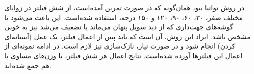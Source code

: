\documentclass[12pt,a4paper]{article}
\theoremstyle{definition}
\theoremstyle{theorem}
\theoremstyle{definition}
\begin{document}
\vspace{0.2cm}
\begin{center}
\vspace{0.5cm}
\end{center}

در روش نواتیا ببو، همان‌گونه که در صورت تمرین آمده‌است، از شش فیلتر در زوایای مختلف صفر، ۳۰، ۶۰، ۹۰، ۱۲۰ و ۱۵۰ درجه، استفاده شده‌است. این باعث می‌شود تا گوشه‌های جهت‌داری که از دید سوبل پنهان می‌ماند یا تضعیف می‌شد نیز به خوبی مشخص باشد.
ایراد این روش، آن است که باید پس از اعمال فیلتر، یک عمل 
(آستانه‌ای کردن) انجام شود و در صورت نیاز، نازک‌سازی نیز لازم است. در ادامه نمونه‌ای از اعمال این فیلترها آورده شده‌است. نتایج اعمال هر شش فیلتر، با وزن‌های مساوی با هم جمع شده‌اند. 
\end{document}
